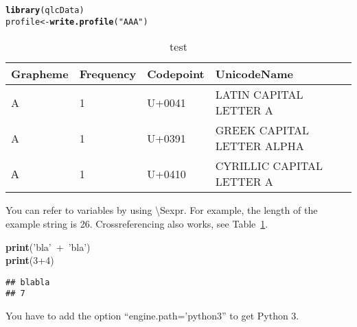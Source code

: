 \documentclass[output=inprep,
		biblatex
		]{LSP/langsci}\usepackage[]{graphicx}\usepackage[]{color}
\makeatletter
\newcommand{\hlnum}[1]{\textcolor[rgb]{0.686,0.059,0.569}{#1}}%
\newcommand{\hlstr}[1]{\textcolor[rgb]{0.192,0.494,0.8}{#1}}%
\newcommand{\hlopt}[1]{\textcolor[rgb]{0,0,0}{#1}}%
\newcommand{\hlstd}[1]{\textcolor[rgb]{0.345,0.345,0.345}{#1}}%
\newcommand{\hlkwa}[1]{\textcolor[rgb]{0.161,0.373,0.58}{\textbf{#1}}}%
\newcommand{\hlkwb}[1]{\textcolor[rgb]{0.69,0.353,0.396}{#1}}%
\newcommand{\hlkwd}[1]{\textcolor[rgb]{0.737,0.353,0.396}{\textbf{#1}}}%
\newenvironment{kframe}{%
 \def\at@end@of@kframe{}%
 \ifinner\ifhmode%
  \def\at@end@of@kframe{\end{minipage}}%
  \begin{minipage}{\columnwidth}%
 \fi\fi%
 \def\FrameCommand##1{\hskip\@totalleftmargin \hskip-\fboxsep
 \colorbox{shadecolor}{##1}\hskip-\fboxsep
     \hskip-\linewidth \hskip-\@totalleftmargin \hskip\columnwidth}%
 \MakeFramed {\advance\hsize-\width
   \@totalleftmargin\z@ \linewidth\hsize
   \@setminipage}}%
 {\par\unskip\endMakeFramed%
 \at@end@of@kframe}
\newenvironment{knitrout}{}{} %
\makeatother
\begin{document}
\begin{knitrout}\footnotesize
{}\color{fgcolor}\begin{kframe}
\begin{alltt}
\hlkwd{library}\hlstd{(qlcData)}
\hlstd{profile} \hlkwb{<-} \hlkwd{write.profile}\hlstd{(}\hlstr{"AΑА"}\hlstd{)}
\end{alltt}
\end{kframe}
\end{knitrout}

\begin{table}[H]
\centering
\begingroup\small
\begin{tabular}{llll}
  \toprule
Grapheme & Frequency & Codepoint & UnicodeName \\ 
  \midrule
A & 1 & U+0041 & LATIN CAPITAL LETTER A \\ 
  Α & 1 & U+0391 & GREEK CAPITAL LETTER ALPHA \\ 
  А & 1 & U+0410 & CYRILLIC CAPITAL LETTER A \\ 
   \bottomrule
\end{tabular}
\endgroup
\caption{test} 
\label{bla}
\end{table}




You can refer to variables by using \textbackslash Sexpr{}. 
For example, the length of the example string is 26.
Crossreferencing also works, see Table~\ref{bla}.

\begin{knitrout}\footnotesize
{}\color{fgcolor}\begin{kframe}
\noindent
\ttfamily
\hlstd{}\hlkwa{print}\hlstd{}\hlopt{(}\hlstd{}\hlstr{'bla'}\hlstd{\ }\hlopt{+\ }\hlstd{}\hlstr{'bla'}\hlstd{}\hlopt{)}\hspace*{\fill}\\
\hlstd{}\hlkwa{print}\hlstd{}\hlopt{(}\hlstd{}\hlnum{3}\hlstd{}\hlopt{+}\hlstd{}\hlnum{4}\hlstd{}\hlopt{)}\hlstd{}\hspace*{\fill}
\mbox{}
\normalfont

\begin{verbatim}
## blabla
## 7
\end{verbatim}
\end{kframe}
\end{knitrout}

You have to add the option ``engine.path='python3'' to get Python 3.
\end{document}
